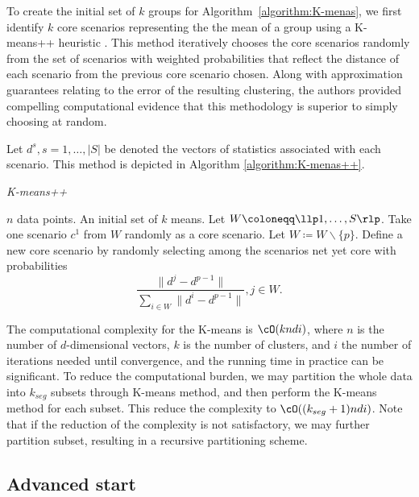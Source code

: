 To create the initial set of $k$ groups for Algorithm~\ref{algorithm:K-menas}, we first identify $k$ core scenarios representing the the mean of a group using a K-means++ heuristic \cite{Arthur.Vassilvitskii2007Kmeans++:advantages}. This method iteratively chooses the core scenarios randomly from the set of scenarios with weighted probabilities that reflect the distance of each scenario from the previous core scenario chosen. Along with approximation guarantees relating to the error of the resulting clustering, the authors provided compelling computational evidence that this methodology is superior to simply choosing at random.

Let $d^s, s = 1,\ldots,|S|$ be denoted the vectors of statistics associated with each scenario. This method is depicted in Algorithm \ref{algorithm:K-menas++}.

\begin{algorithm}[ht!]
\caption{\textit{K-means++}}
\label{algorithm:K-menas++}
\begin{algorithmic}[1]
    \REQUIRE $n$ data points.
    \ENSURE An initial set of $k$ means.
    \STATE Let $W \coloneqq \llp 1, \ldots, S \rlp$.
    \STATE Take one scenario $c^1$ from $W$ randomly as a core scenario.
        \STATE Let $W \coloneqq W\backslash \{ p \}$.
        \STATE Define a new core scenario by randomly selecting among the scenarios net yet core with probabilities
        $$
            \frac{\| d^{j} - d^{p-1}  \|}{ \sum_{i \in W}\|d^i - d^{p-1} \| }, j \in W.
        $$
    \ENDFOR
\end{algorithmic}
\end{algorithm}

The computational complexity for the K-means is $\cO(kndi)$, where $n$ is the number of $d$-dimensional vectors, $k$ is the number of clusters, and $i$ the number of iterations needed until convergence, and the running time in practice can be significant. To reduce the computational burden, we may partition the whole data into $k_{seg}$ subsets through K-means method, and then perform the K-means method for each subset. This reduce the complexity to $\cO((k_{seg} + 1)ndi)$. Note that if the reduction of the complexity is not satisfactory, we may further partition subset, resulting in a recursive partitioning scheme.

\subsection{Advanced start}
\label{subsec:Advanced start}

